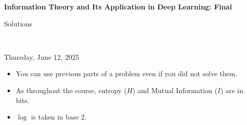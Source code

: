 \documentclass[12pt]{article}
\begin{document}
\begin{center}
{\bf Information Theory and Its Application in Deep Learning: Final \begin{solution}Solutions\end{solution}} \\ \medskip
\begin{problem}Thursday, June 12, 2025 \end{problem}
\end{center}

\begin{problem}
\noindent 
\begin{itemize}
\item You can use previous parts of a problem even if you did not solve them.
\item As throughout the course, entropy ($H$) and Mutual Information ($I$) are in bits.
\item $\log$ is taken in base 2. 
\end{itemize}
\end{problem}
\begin{solution}
\end{solution}

\end{document}

